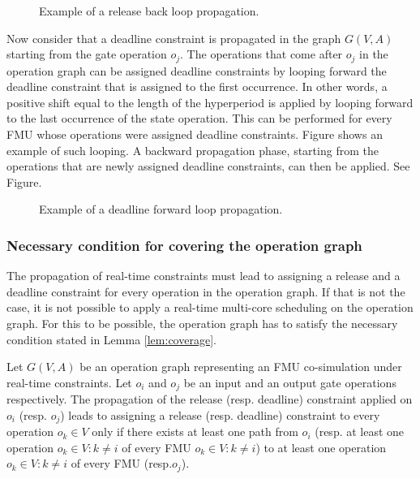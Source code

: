 \begin{figure}[phbt]
\centering

\caption{Example of a release back loop propagation.}
\label{fig:rloop}
\end{figure}  

Now consider that a deadline constraint is propagated in the graph $G(V,A)$ starting from the gate operation $o_j$. The operations that come after $o_j$ in the operation graph can be assigned deadline constraints by looping forward the deadline constraint that is assigned to the first occurrence. In other words, a positive shift equal to the length of the hyperperiod is applied by looping forward to the last occurrence of the state operation. This can be performed for every FMU whose operations were assigned deadline constraints. Figure shows an example of such looping. A backward propagation phase, starting from the operations that are newly assigned deadline constraints, can then be applied. See Figure.

\begin{figure}[phbt]
\centering

\caption{Example of a deadline forward loop propagation.}
\label{fig:dloop}
\end{figure}   

\subsubsection{Necessary condition for covering the operation graph}

The propagation of real-time constraints must lead to assigning a release and a deadline constraint for every operation in the operation graph. If that is not the case, it is not possible to apply a real-time multi-core scheduling on the operation graph. For this to be possible, the operation graph has to satisfy the necessary condition stated in Lemma \ref{lem:coverage}.

\begin{lemma}
Let $G(V,A)$ be an operation graph representing an FMU co-simulation under real-time constraints. Let $o_i$ and $o_j$ be an input and an output gate operations respectively. The propagation of the release (resp. deadline) constraint applied on $o_i$ (resp. $o_j$) leads to assigning a release (resp. deadline) constraint to every operation $o_k \in V$ only if there exists at least one path from $o_i$ (resp. at least one operation $o_k \in  V : k \neq i$ of every FMU $o_k \in  V : k \neq i$) to at least one operation $o_k \in  V : k \neq i$ of every FMU (resp.$o_j$).  
\label{lem:coverage}
\end{lemma}


